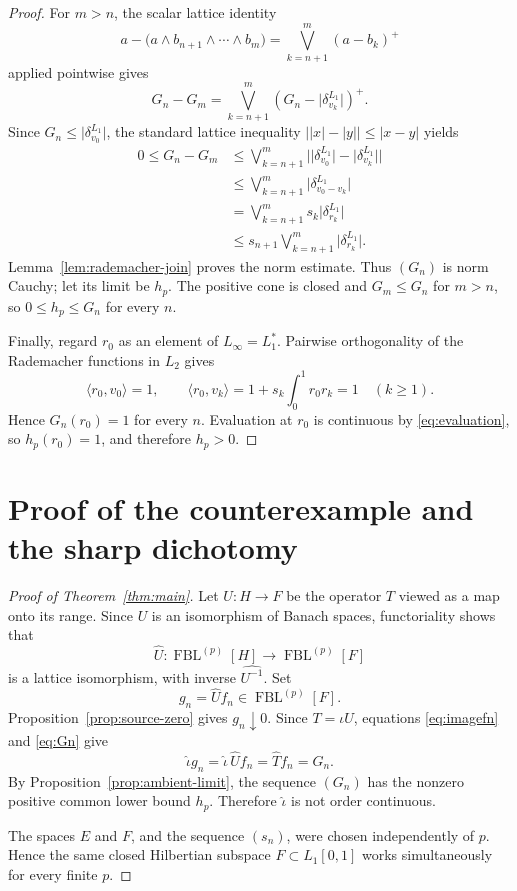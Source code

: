 \documentclass[11pt]{article}
\theoremstyle{remark}
\newcommand{\FBL}[2]{\operatorname{FBL}^{(#1)}[#2]}
\newcommand{\wh}[1]{\widehat{#1}}
\newcommand{\abs}[1]{\lvert #1\rvert}
\newcommand{\pair}[2]{\langle #1,#2\rangle}
\begin{document}
\begin{proof}
For \(m>n\), the scalar lattice identity
\[
 a-\bigl(a\wedge b_{n+1}\wedge\cdots\wedge b_m\bigr)
 =\bigvee_{k=n+1}^m(a-b_k)^+
\]
applied pointwise gives
\[
  G_n-G_m
  =\bigvee_{k=n+1}^m
      \left(G_n-\abs{\delta_{v_k}^{L_1}}\right)^+.
\]
Since \(G_n\le\abs{\delta_{v_0}^{L_1}}\), the standard lattice inequality
\(\bigl\lvert\abs{x}-\abs{y}\bigr\rvert\le\abs{x-y}\) yields
\[
 \begin{aligned}
  0\le G_n-G_m
  &\le\bigvee_{k=n+1}^m
      \bigl\lvert
       \abs{\delta_{v_0}^{L_1}}-\abs{\delta_{v_k}^{L_1}}
      \bigr\rvert\\
  &\le\bigvee_{k=n+1}^m
      \abs{\delta_{v_0-v_k}^{L_1}}\\
  &=\bigvee_{k=n+1}^m s_k\abs{\delta_{r_k}^{L_1}}\\
  &\le s_{n+1}\bigvee_{k=n+1}^m\abs{\delta_{r_k}^{L_1}}.
 \end{aligned}
\]
Lemma~\ref{lem:rademacher-join} proves the norm estimate.  Thus \((G_n)\)
is norm Cauchy; let its limit be \(h_p\).  The positive cone is closed and
\(G_m\le G_n\) for \(m>n\), so \(0\le h_p\le G_n\) for every \(n\).

Finally, regard \(r_0\) as an element of \(L_\infty=L_1^*\).  Pairwise
orthogonality of the Rademacher functions in \(L_2\) gives
\[
  \pair{r_0}{v_0}=1,
  \qquad
  \pair{r_0}{v_k}=1+s_k\int_0^1r_0r_k=1 \quad(k\ge1).
\]
Hence \(G_n(r_0)=1\) for every \(n\).  Evaluation at \(r_0\) is continuous
by \eqref{eq:evaluation}, so \(h_p(r_0)=1\), and therefore \(h_p>0\).
\end{proof}

\section{Proof of the counterexample and the sharp dichotomy}

\begin{proof}[Proof of Theorem~\ref{thm:main}]
Let \(U:H\to F\) be the operator \(T\) viewed as a map onto its range.
Since \(U\) is an isomorphism of Banach spaces, functoriality shows that
\[
  \wh U:\FBL{p}{H}\longrightarrow\FBL{p}{F}
\]
is a lattice isomorphism, with inverse \(\widehat{U^{-1}}\).  Set
\[
  g_n=\wh U f_n\in\FBL{p}{F}.
\]
Proposition~\ref{prop:source-zero} gives \(g_n\downarrow0\).  Since
\(T=\iota U\), equations \eqref{eq:imagefn} and \eqref{eq:Gn} give
\[
  \wh\iota g_n=\wh\iota\,\wh U f_n=\wh T f_n=G_n.
\]
By Proposition~\ref{prop:ambient-limit}, the sequence \((G_n)\) has the
nonzero positive common lower bound \(h_p\).  Therefore \(\wh\iota\) is not
order continuous.

The spaces \(E\) and \(F\), and the sequence \((s_n)\), were chosen
independently of \(p\).  Hence the same closed Hilbertian subspace
\(F\subset L_1[0,1]\) works simultaneously for every finite \(p\).
\end{proof}
\end{document}
